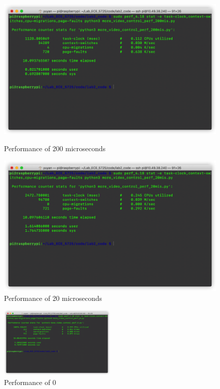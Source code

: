 \documentclass[12pt]{report}
\begin{document}
\begin{figure}[H]
\centering
\begin{minipage}[t]{0.48\textwidth}
\centering
\includegraphics[width=\textwidth]{img/more_video_control_perf_200mis.py.png}
\caption{Performance of 200 microseconds}
\label{fig:fig6}
\end{minipage}
\begin{minipage}[t]{0.48\textwidth}
\centering
\includegraphics[width=\textwidth]{img/more_video_control_perf_20mis.png}
\caption{Performance of 20 microseconds}
\label{fig:fig7}
\end{minipage}
\end{figure}
\begin{figure}[H]
    \centering
    \includegraphics[width=0.5\textwidth]{img/more_video_control_perf_0.png}
    \caption{Performance of 0}
    \label{fig:fig8}
\end{figure}
\end{document}
